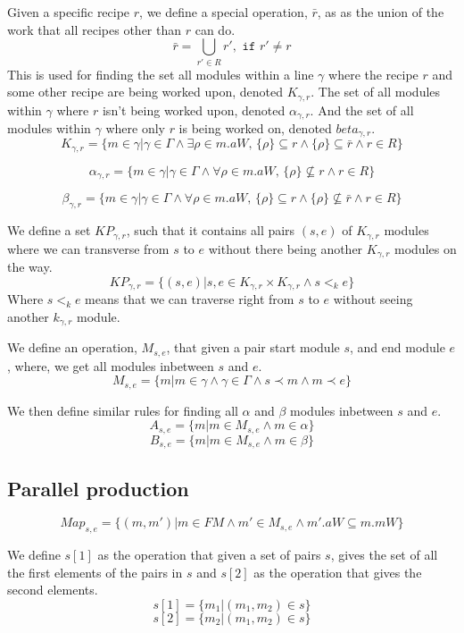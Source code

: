 Given a specific recipe $r$, we define a special operation, $\bar{r}$, as as the union of the work that all recipes other than $r$ can do. 
\[\bar{r} = \bigcup_{r' \in R}r', \texttt{ if } r' \neq r\]
This is used for finding the set all modules within a line $\gamma$ where the recipe $r$ and some other recipe are being worked upon, denoted $K_{\gamma ,r}$. The set of all modules within $\gamma$ where $r$ isn't being worked upon, denoted $\alpha_{\gamma ,r}$. And the set of all modules within $\gamma$ where only $r$ is being worked on, denoted $beta_{\gamma ,r}$. 
\[K_{\gamma ,r} = \{m \in \gamma | \gamma \in \Gamma \land \exists \rho \in m.aW,\, \{\rho\} \subseteq r \land \{\rho\} \subseteq \bar{r} \land r \in R\}\]

\[\alpha_{\gamma ,r}  = \{m \in \gamma | \gamma \in \Gamma \land \forall \rho \in m.aW,\, \{\rho\} \nsubseteq r \land r \in R\}\]

\[\beta_{\gamma ,r}  = \{m \in \gamma | \gamma \in \Gamma \land \forall \rho \in m.aW,\, \{\rho\} \subseteq r \land \{\rho\} \nsubseteq \bar{r} \land r \in R\}\]


We define a set $KP_{\gamma ,r}$, such that it contains all pairs $(s, e)$ of $K_{\gamma ,r}$ modules where we can transverse from $s$ to $e$ without there being another $K_{\gamma, r}$ modules on the way.
\[KP_{\gamma ,r} = \{(s, e)| {s, e} \in K_{\gamma ,r} \times K_{\gamma ,r} \land s <_k  e\}\]
Where $s <_k e$ means that we can traverse right from $s$ to $e$ without seeing another $k_{\gamma, r}$ module. 

We define an operation, $M_{s,e}$, that given a pair start module $s$, and end module  $e$, where, we get all modules inbetween $s$ and $e$.
\[M_{s,e} = \{m | m \in \gamma \land \gamma \in \Gamma \land s \prec m \land m \prec e\}\]

We then define similar rules for finding all $\alpha$ and $\beta$ modules inbetween $s$ and $e$.
\[A_{s,e} = \{m |m \in M_{s,e} \land m \in \alpha\}\]
\[B_{s,e} = \{m |m \in M_{s,e} \land m \in \beta\}\]

\subsection{Parallel production}

\[Map_{s, e} = \{(m, m')| m \in FM \land m' \in M_{s,e} \land m'.aW \subseteq m.mW\} \]

We define $s[1]$ as the operation that given a set of pairs $s$, gives the set of all the first elements of the pairs in $s$ and $s[2]$ as the operation that gives the second elements.
\[s[1] = \{m_1 | (m_1, m_2) \in s\}\]
\[s[2] = \{m_2 | (m_1, m_2) \in s\}\]

